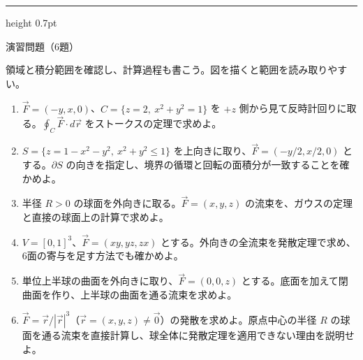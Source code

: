 \documentclass[a4paper,10pt,pdflatex,ja=standard,jafont=ipaex-type1,
  magstyle=real,scale=1]{bxjsarticle}
\newcommand{\topic}[1]{\par\vspace{5pt}%
  {\large\sffamily\mdseries\color{accent}#1}\par\vspace{2pt}}
\newenvironment{problems}
  {\begin{enumerate}[leftmargin=2em,itemsep=3pt,topsep=3pt,parsep=0pt,
    font=\color{accent}]}
  {\end{enumerate}}
\newcommand{\problemspace}{\par\vspace{5mm}}
\newcommand{\exercises}{%
  {\color{accent}\hrule height 0.7pt}\vspace{3pt}%
  \topic{演習問題（6題）}%
  {\small 領域と積分範囲を確認し、計算過程も書こう。図を描くと範囲を読み取りやすい。}\par}
\begin{document}
\noindent\begin{minipage}[b][0.5\textheight][t]{\linewidth}
\exercises
\begin{problems}
\item $\vec F=(-y,x,0)$、$C=\{z=2,\ x^2+y^2=1\}$ を $+z$ 側から見て反時計回りに取る。$\oint_C\vec F\cdot d\vec r$ をストークスの定理で求めよ。
\problemspace

\item $S=\{z=1-x^2-y^2,\ x^2+y^2\le1\}$ を上向きに取り、$\vec F=(-y/2,x/2,0)$ とする。$\partial S$ の向きを指定し、境界の循環と回転の面積分が一致することを確かめよ。
\problemspace

\item 半径 $R>0$ の球面を外向きに取る。$\vec F=(x,y,z)$ の流束を、ガウスの定理と直接の球面上の計算で求めよ。
\problemspace

\item $V=[0,1]^3$、$\vec F=(xy,yz,zx)$ とする。外向きの全流束を発散定理で求め、6面の寄与を足す方法でも確かめよ。
\problemspace

\item 単位上半球の曲面を外向きに取り、$\vec F=(0,0,z)$ とする。底面を加えて閉曲面を作り、上半球の曲面を通る流束を求めよ。
\problemspace

\item $\vec F=\vec r/|\vec r|^3$（$\vec r=(x,y,z)\ne\vec0$）の発散を求めよ。原点中心の半径 $R$ の球面を通る流束を直接計算し、球全体に発散定理を適用できない理由を説明せよ。
\problemspace
\end{problems}
\end{minipage}
\end{document}
